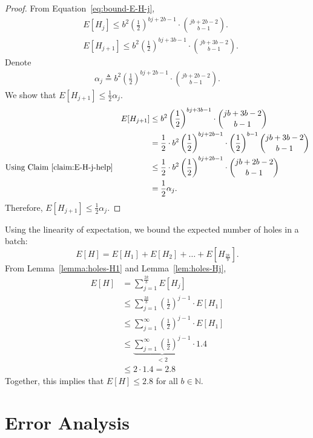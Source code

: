 \begin{proof}
From Equation~\ref{eq:bound-E-H-j},
\begin{align}
&E[H_j] \leq b^2 \left(\frac{1}{2}\right)^{bj+2b -1} \cdot {{jb+2b-2} \choose {b-1}}. \\
&E[H_{j+1}] \leq b^2 \left(\frac{1}{2}\right)^{bj+3b -1} \cdot {{jb+3b-2} \choose {b-1}}. 
\end{align}
Denote
\begin{align}
        \alpha_j \triangleq b^2 \left(\frac{1}{2}\right)^{bj+2b -1} \cdot {{jb+2b-2} \choose {b-1}}.
\end{align}
We show that $E[H_{j+1}] \leq \frac{1}{2}\alpha_j$.
\begin{align}
&& E[H_{j+1}] &\leq b^2 \left(\frac{1}{2}\right)^{bj+3b -1} \cdot {{jb+3b-2} \choose {b-1}} \\ &&              &= \frac{1}{2} \cdot b^2 \left(\frac{1}{2}\right)^{bj+2b -1} \cdot \left(\frac{1}{2}\right)^{b-1} {{jb+3b-2} \choose {b-1}} \\
\text{Using Claim~\ref{claim:E-H-j-help}}&&              &\leq \frac{1}{2} \cdot b^2 \left(\frac{1}{2}\right)^{bj+2b -1} \cdot {{jb+2b-2} \choose {b-1}} \\
&&              &= \frac{1}{2}\alpha_j.
\end{align}
Therefore, $E[H_{j+1}] \leq \frac{1}{2}\alpha_j$.
\end{proof}
Using the linearity of expectation, we bound the expected number of holes in a batch:
\[E\left[H\right]= E\left[H_1\right] + E\left[H_2\right] + \dots + E\left[H_{\frac{2k}{b}}\right]. \]
From Lemma~\ref{lemma:holes-H1} and Lemma~\ref{lem:holes-Hj}, 
\begin{align}
    E[H] &= \sum_{j=1}^{\frac{2k}{b}} E[H_j] \\
        &\leq  \sum_{j=1}^{\frac{2k}{b}} \left(\frac{1}{2}\right)^{j-1}\cdot E[H_1] \\
        &\leq  \sum_{j=1}^{\infty} \left(\frac{1}{2}\right)^{j-1}\cdot E[H_1] \\
        &\leq  \underbrace{\sum_{j=1}^{\infty} \left(\frac{1}{2}\right)^{j-1}}_{<2}\cdot 1.4 \\
        &\leq 2\cdot 1.4 = 2.8
\end{align}
Together, this implies that  $E[H] \leq 2.8$ for all $b \in \mathds{N}$.

\section{Error Analysis}
\label{sec:error-analysis}

